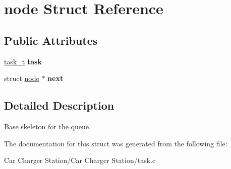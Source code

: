 \hypertarget{structnode}{\section{node Struct Reference}
\label{structnode}
}
\subsection*{Public Attributes}
\begin{DoxyCompactItemize}
\item 
\hypertarget{structnode_afe2c3847ff52d94607fe5e22c410671c}{\hyperlink{uniontask__t}{task\+\_\+t} {\bfseries task}}\label{structnode_afe2c3847ff52d94607fe5e22c410671c}

\item 
\hypertarget{structnode_aa3e8aa83f864292b5a01210f4453fcc0}{struct \hyperlink{structnode}{node} $\ast$ {\bfseries next}}\label{structnode_aa3e8aa83f864292b5a01210f4453fcc0}

\end{DoxyCompactItemize}


\subsection{Detailed Description}
Base skeleton for the queue. 

The documentation for this struct was generated from the following file\+:\begin{DoxyCompactItemize}
\item 
Car Charger Station/\+Car Charger Station/task.\+c\end{DoxyCompactItemize}

